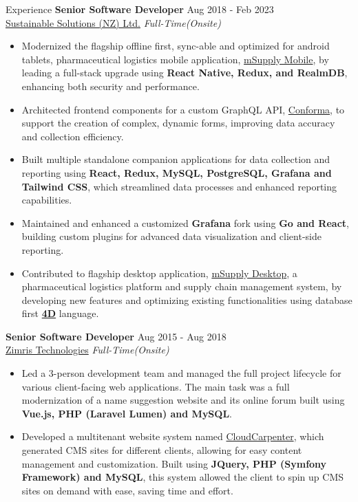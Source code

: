 \documentclass{resume} %
\begin{document}
\begin{rSection}{Experience}
\textbf{Senior Software Developer} \hfill Aug 2018 - Feb 2023 \\
\href{https://sussol.net/}{Sustainable Solutions (NZ) Ltd.} \hfill \textit{Full-Time(Onsite)}
 \begin{itemize}
    \itemsep -3pt {} 
     \item Modernized the flagship offline first, sync-able and optimized for android tablets, pharmaceutical logistics mobile application, \href{https://msupply.org.nz/mobile/}{mSupply Mobile}, by leading a full-stack upgrade using \textbf{React Native, Redux, and RealmDB}, enhancing both security and performance.
     \item Architected frontend components for a custom GraphQL API, \href{https://docs.conforma.nz/docs/about/introduction/}{Conforma}, to support the creation of complex, dynamic forms, improving data accuracy and collection efficiency.
     \item Built multiple standalone companion applications for data collection and reporting using \textbf{React, Redux, MySQL, PostgreSQL, Grafana and Tailwind CSS}, which streamlined data processes and enhanced reporting capabilities.
     \item Maintained and enhanced a customized \textbf{Grafana} fork using \textbf{Go and React}, building custom plugins for advanced data visualization and client-side reporting.
     \item Contributed to flagship desktop application, \href{https://msupply.org.nz/}{mSupply Desktop}, a pharmaceutical logistics platform and supply chain management system, by developing new features and optimizing existing functionalities using database first \textbf{\href{https://us.4d.com/}{4D}} language.
 \end{itemize}

\textbf{Senior Software Developer} \hfill Aug 2015 - Aug 2018 \\
\href{https://www.zimris.com/}{Zimris Technologies} \hfill \textit{Full-Time(Onsite)}
 \begin{itemize}
    \itemsep -3pt {} 
     \item Led a 3-person development team and managed the full project lifecycle for various client-facing web applications. The main task was a full modernization of a name suggestion website and its online forum built using \textbf{Vue.js, PHP (Laravel Lumen) and MySQL}.
     \item Developed a multitenant website system named \href{https://cloudcarpenter.com/}{CloudCarpenter}, which generated CMS sites for different clients, allowing for easy content management and customization. Built using \textbf{JQuery, PHP (Symfony Framework) and MySQL}, this system allowed the client to spin up CMS sites on demand with ease, saving time and effort.
 \end{itemize}


\end{rSection}
\end{document}
